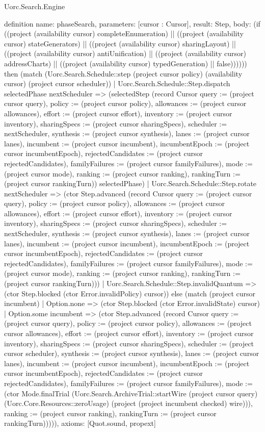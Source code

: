 \begin{lexlean}{Uorc.Search.Engine}
\begin{semanticmodule}
definition{
  name: phaseSearch,
  parameters: [cursor : Cursor],
  result: Step,
  body: (if ((project (availability cursor) completeEnumeration) || ((project (availability cursor) stateGenerators) || ((project (availability cursor) sharingLayout) || ((project (availability cursor) antiUnification) || ((project (availability cursor) addressCharts) || ((project (availability cursor) typedGeneration) || false)))))) then (match (Uorc.Search.Schedule::step (project cursor policy) (availability cursor) (project cursor scheduler))
    | Uorc.Search.Schedule::Step.dispatch selectedPhase nextScheduler => (selectedStep (record Cursor {query := (project cursor query), policy := (project cursor policy), allowances := (project cursor allowances), effort := (project cursor effort), inventory := (project cursor inventory), sharingSpecs := (project cursor sharingSpecs), scheduler := nextScheduler, synthesis := (project cursor synthesis), lanes := (project cursor lanes), incumbent := (project cursor incumbent), incumbentEpoch := (project cursor incumbentEpoch), rejectedCandidates := (project cursor rejectedCandidates), familyFailures := (project cursor familyFailures), mode := (project cursor mode), ranking := (project cursor ranking), rankingTurn := (project cursor rankingTurn)}) selectedPhase)
    | Uorc.Search.Schedule::Step.rotate nextScheduler => (ctor Step.advanced (record Cursor {query := (project cursor query), policy := (project cursor policy), allowances := (project cursor allowances), effort := (project cursor effort), inventory := (project cursor inventory), sharingSpecs := (project cursor sharingSpecs), scheduler := nextScheduler, synthesis := (project cursor synthesis), lanes := (project cursor lanes), incumbent := (project cursor incumbent), incumbentEpoch := (project cursor incumbentEpoch), rejectedCandidates := (project cursor rejectedCandidates), familyFailures := (project cursor familyFailures), mode := (project cursor mode), ranking := (project cursor ranking), rankingTurn := (project cursor rankingTurn)}))
    | Uorc.Search.Schedule::Step.invalidQuantum => (ctor Step.blocked (ctor Error.invalidPolicy) cursor)) else (match (project cursor incumbent)
    | Option.none => (ctor Step.blocked (ctor Error.invalidState) cursor)
    | Option.some incumbent => (ctor Step.advanced (record Cursor {query := (project cursor query), policy := (project cursor policy), allowances := (project cursor allowances), effort := (project cursor effort), inventory := (project cursor inventory), sharingSpecs := (project cursor sharingSpecs), scheduler := (project cursor scheduler), synthesis := (project cursor synthesis), lanes := (project cursor lanes), incumbent := (project cursor incumbent), incumbentEpoch := (project cursor incumbentEpoch), rejectedCandidates := (project cursor rejectedCandidates), familyFailures := (project cursor familyFailures), mode := (ctor Mode.finalTrial (Uorc.Search.ArchiveTrial::startWire (project cursor query) (Uorc.Core.Resources::zeroUsage) (project (project incumbent checked) wire))), ranking := (project cursor ranking), rankingTurn := (project cursor rankingTurn)})))),
  axioms: [Quot.sound, propext]
}


\end{semanticmodule}
\end{lexlean}
